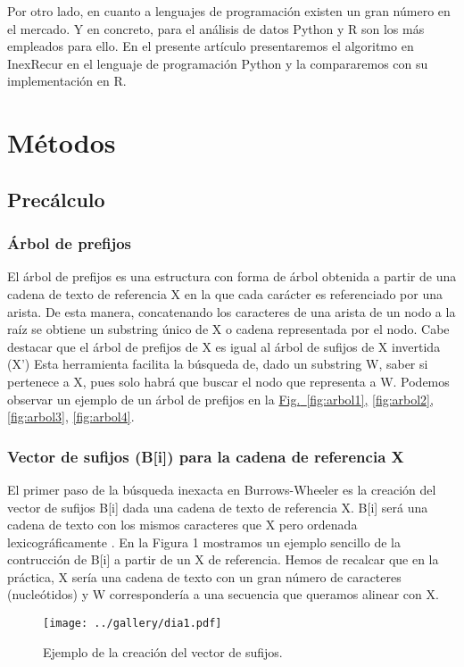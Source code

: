 \documentclass{article}
\begin{document}
Por otro lado, en cuanto a lenguajes de programación existen  un  gran
número en el mercado.  Y en concreto, para el análisis de datos Python
y R son  los  más  empleados  para  ello.   En	el  presente  artículo
presentaremos el algoritmo en InexRecur en el lenguaje de programación
Python	 y   la   compararemos	 con   su   implementación    en    R.

\section{Métodos}
\subsection{Precálculo}
\subsubsection{Árbol de prefijos}

El árbol de prefijos es una estructura con forma de árbol  obtenida  a
partir de una cadena de texto de referencia X en la que cada  carácter
es referenciado por una arista.   De  esta  manera,  concatenando  los
caracteres de una arista de un nodo a la raíz se obtiene un  substring
único de X o cadena representada por el nodo.  Cabe  destacar  que  el
árbol de prefijos de X es igual al árbol de  sufijos  de  X  invertida
(X’) Esta herramienta facilita la búsqueda de, dado  un  substring  W,
saber si pertenece a X,  pues  solo  habrá  que  buscar  el  nodo  que
representa a W.  Podemos observar un ejemplo de un árbol  de  prefijos
en la \hyperref[fig:arbol1]{{Fig.}~\ref*{fig:arbol1},}
\hyperref[fig:arbol2]{\ref*{fig:arbol2},}
\hyperref[fig:arbol3]{\ref*{fig:arbol3},}
\hyperref[fig:arbol4]{\ref*{fig:arbol4}}.

\subsubsection{Vector de sufijos (B[i]) para la cadena de referencia X
}


El primer paso de  la  búsqueda  inexacta  en  Burrows-Wheeler	es  la
creación del vector de sufijos	B[i]  dada  una  cadena  de  texto  de
referencia X.  B[i] será una cadena de texto con los mismos caracteres
que X pero ordenada lexicográficamente \cite{belda_2020}. En la Figura
1 mostramos un ejemplo sencillo de la contrucción de B[i] a partir  de
un X de referencia.  Hemos de recalcar que en la práctica, X sería una
cadena de texto con un gran número de  caracteres  (nucleótidos)  y  W
correspondería	a  una	secuencia  que	 queramos   alinear   con   X.
\begin{figure}[h]
\centering
\texttt{[image: ../gallery/dia1.pdf]}
\caption{Ejemplo de la creación del vector de sufijos.}
\label{fig:dia1}
\end{figure}
\end{document}
